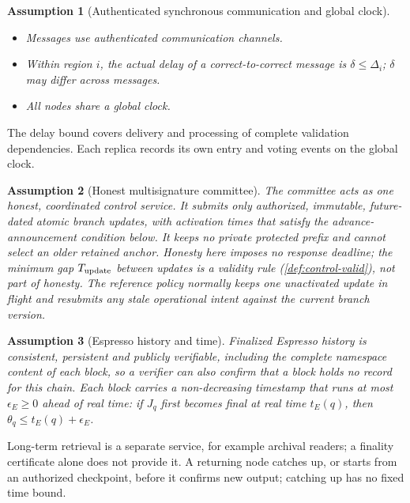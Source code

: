 \documentclass[11pt,a4paper]{article}
\newtheorem{assumption}[assumption]{Assumption}
\begin{document}
\begin{assumption}[Authenticated synchronous communication and global clock]
\label{ass:network}
\leavevmode\par
\begin{itemize}
\item Messages use authenticated communication channels.
\item Within region $i$, the actual delay of a correct-to-correct
message is $\delta\le\Delta_i$; $\delta$ may differ across messages.
\item All nodes share a global clock.
\end{itemize}
\end{assumption}
The delay bound covers delivery and processing of complete validation
dependencies. Each replica records its own entry and voting events on
the global clock.

\begin{assumption}[Honest multisignature committee]
\label{ass:committee}
The committee acts as one honest, coordinated control service. It
submits only authorized, immutable, future-dated atomic branch updates, with
activation times that satisfy the advance-announcement condition below. It keeps no private protected prefix and cannot select
an older retained anchor. Honesty here imposes no response deadline; the
minimum gap $T_{\rm update}$ between updates is a validity rule
(\cref{def:control-valid}), not part of honesty.  The reference policy
normally keeps one unactivated update in flight and resubmits any stale
operational intent against the current branch version.
\end{assumption}

\begin{assumption}[Espresso history and time]
\label{ass:espresso}
Finalized Espresso history is consistent, persistent and publicly
verifiable, including the complete namespace content of each block, so a
verifier can also confirm that a block holds no record for this chain.
Each block carries a non-decreasing timestamp that runs at most
$\epsilon_E\ge0$ ahead of real time: if $J_q$ first becomes final at real
time $t_E(q)$, then $\theta_q\le t_E(q)+\epsilon_E$.
\end{assumption}
Long-term retrieval is a separate service, for example archival readers;
a finality certificate alone does not provide it. A returning node
catches up, or starts from an authorized checkpoint, before it confirms
new output; catching up has no fixed time bound.
\end{document}
